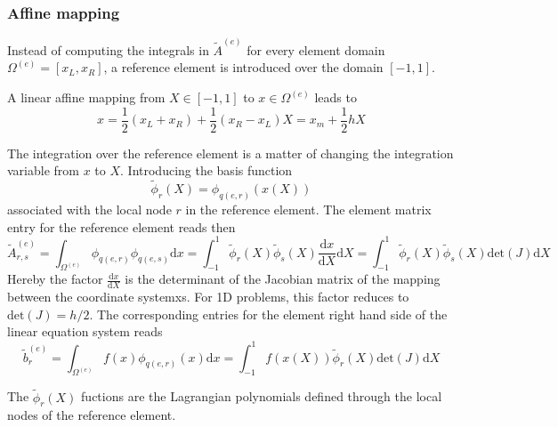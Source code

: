 \documentclass[11pt]{article}
\begin{document}
\subsubsection{Affine mapping}\label{affine-mapping}

Instead of computing the integrals in \(\tilde{A}^{(e)}\) for every
element domain \(\Omega^{(e)} = [x_L, x_R]\), a reference element is
introduced over the domain \([-1,1]\).

A linear affine mapping from \(X \in [-1,1]\) to \(x \in \Omega^{(e)}\)
leads to \[
x 
= \frac{1}{2} (x_L + x_R) + \frac{1}{2} (x_R - x_L) X 
= x_m + \frac{1}{2} h X 
\]

The integration over the reference element is a matter of changing the
integration variable from \(x\) to \(X\). Introducing the basis function
\[
\tilde{\phi}_r(X) =  \phi_{q(e,r)}\left(x(X)\right)
\] associated with the local node \(r\) in the reference element. The
element matrix entry for the reference element reads then \[
\tilde{A}^{(e)}_{r,s} 
= \int_{\Omega^{(e)}} \phi_{q(e,r)} \phi_{q(e,s)} \text{d}x
= \int_{-1}^{1} \tilde{\phi}_r(X) \tilde{\phi}_s(X) \frac{\text{d}x}{\text{d}X} \text{d}X
= \int_{-1}^{1} \tilde{\phi}_r(X) \tilde{\phi}_s(X) \text{det}(J)  \text{d}X
\] Hereby the factor \(\frac{\text{d}x}{\text{d}X}\) is the determinant
of the Jacobian matrix of the mapping between the coordinate systemxs.
For 1D problems, this factor reduces to \(\text{det}(J) = h/2\). The
corresponding entries for the element right hand side of the linear
equation system reads \[
\tilde{b}_{r}^{(e)} 
= \int_{\Omega^{(e)}} f(x) \phi_{q(e,r)}(x) \text{d}x
= \int_{-1}^1 f\left(x(X)\right) \tilde{\phi}_r(X) \text{det}(J)  \text{d}X
\]

The \(\tilde{\phi}_r(X)\) fuctions are the Lagrangian polynomials
defined through the local nodes of the reference element.
\end{document}
